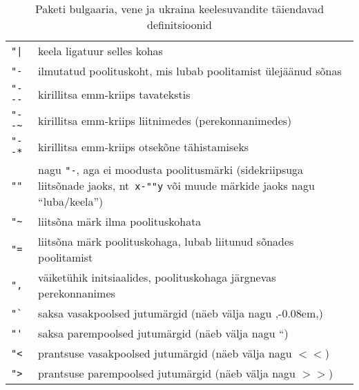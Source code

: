 \begin{table}[htb]
  \caption[Bulgaaria, vene ja ukraina keel]{Paketi  bulgaaria,
  vene ja ukraina keelesuvandite täiendavad definitsioonid}\label{Cyrillic}
  \begin{lined}{\textwidth}
  \begin{tabular}{@{}p{.1\hsize}@{}p{.9\hsize}@{}}
   \verb="|= & keela ligatuur selles kohas               \\
   \verb|"-| & ilmutatud poolituskoht, mis lubab poolitamist
               ülejäänud sõnas                         \\
   \verb|"---| & kirillitsa emm-kriips tavatekstis                      \\
   \verb|"--~| & kirillitsa emm-kriips liitnimedes (perekonnanimedes)       \\
   \verb|"--*| & kirillitsa emm-kriips otsekõne tähistamiseks         \\
   \verb|""| & nagu \verb|"-|, aga ei moodusta poolitusmärki
               (sidekriipsuga liitsõnade jaoks, nt\ \verb|x-""y|
               või muude märkide jaoks nagu "`luba/keela"')     \\
   \verb|"~| & liitsõna märk ilma poolituskohata        \\
   \verb|"=| & liitsõna märk poolituskohaga, lubab liitunud sõnades
               poolitamist                   \\
   \verb|",| & väiketühik initsiaalides, poolituskohaga järgnevas
               perekonnanimes                                \\
   \verb|"`| & saksa vasakpoolsed jutumärgid
               (näeb välja nagu ,\kern-0.08em,)                     \\
   \verb|"'| & saksa parempoolsed jutumärgid (näeb välja nagu ``)       \\%
   \verb|"<| & prantsuse vasakpoolsed jutumärgid (näeb välja nagu $<\!\!<$)  \\
   \verb|">| & prantsuse parempoolsed jutumärgid (näeb välja nagu $>\!\!>$) \\
  \end{tabular}
  \bigskip
  \end{lined}
\end{table}

